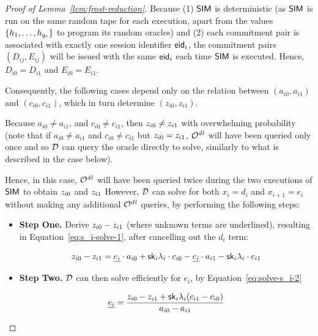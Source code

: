 \begin{proof}[Proof of Lemma~\ref{lem:frost-reduction}]
Because (1) $\mathsf{SIM}$ is deterministic
(as $\mathsf{SIM}$ is run on the same random tape for each execution, apart from the
values  $\{h_1, \ldots, h_{q_r} \}$ to program its random oracles)
and (2) each commitment pair is associated with exactly one session identifier $\mathsf{eid}_i$,
the commitment pairs $(D_{ij}, E_{ij})$  will be issued with the same $\mathsf{eid}_i$ each time $\mathsf{SIM}$ is executed.
%
Hence, $D_{i0} = D_{i1}$ and $E_{i0} = E_{i1}$.

Consequently,
the following cases depend only on  the relation between
$(a_{i0}, a_{i1})$ and $(c_{i0}, c_{i1})$,
which in turn determine $(z_{i0}, z_{i1})$.

\begin{case}
Because
  $a_{i0} \neq a_{i1}$,
  and $c_{i0} \neq c_{i1}$,
then
$z_{i0} \neq z_{i1}$ with overwhelming probability
(note that if
$a_{i0} \neq a_{i1}$ and $c_{i0} \neq c_{i1}$
but $z_{i0} = z_{i1}$,
$\mathcal{O}^{\mathit{dl}}$ will have been queried only once and so $\mathcal{D}$ can query the oracle directly
to solve,
similarly to what is described in the case below).

Hence,  in this case, $\mathcal{O}^{\mathit{dl}}$ will have been queried twice during the two executions of $\mathsf{SIM}$ to obtain $z_{i0} $ and $z_{i1}$
However,
$\mathcal{D}$ can solve for both  $x_i=d_i$ and $x_{i+1} = e_i$ without making any additional $\mathcal{O}^{\mathit{dl}}$ queries, by performing the following steps:

\begin{itemize}
  \item \textbf{Step One.} Derive $z_{i0} -z_{i1} $ (where unknown terms are underlined),
    resulting in Equation~\ref{eq:s_i-solve-1}, after cancelling out the $d_i$ term:

       \begin{equation} \label{eq:s_i-solve-1}
       z_{i0} - z_{i1} = \underline{e_i}\cdot a_{i0} + \mathsf{sk}_i \lambda_i \cdot c_{i0} - \underline{e_i}\cdot a_{i1} - \mathsf{sk}_i \lambda_i \cdot c_{i1}
   \end{equation}

    \item \textbf{Step Two.} $\mathcal{D}$ can then solve efficiently for $e_i$, by Equation~\ref{eq:solve-s_i-2}

    \begin{equation} \label{eq:solve-s_i-2}
        \underline{e_i} = \frac{ z_{i0} - z_{i1} + \mathsf{sk}_i \lambda_i ( c_{i1} - c_{i0})}{a_{i0}  - a_{i1}}
    \end{equation}


\end{itemize}
\end{case}
\end{proof}
